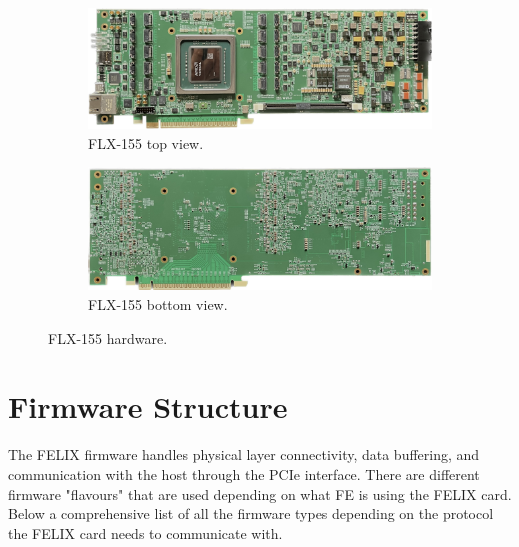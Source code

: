 \begin{figure}[H]
\centering
\begin{subfigure}[b]{0.7\textwidth}
    \centering
    \includegraphics[width=\textwidth]{images/felix/flx155_top.jpg}
    \caption{FLX-155 top view.}
    \label{fig:FLX-155-top}
\end{subfigure}

\vspace{0.2cm}

\begin{subfigure}[b]{0.7\textwidth}
    \centering
    \includegraphics[width=\textwidth]{images/felix/flx155_bot.jpg}
    \caption{FLX-155 bottom view.}
    \label{fig:FLX-155-bot}
\end{subfigure}
\caption{FLX-155 hardware.}
\label{fig:FLX-155}
\end{figure}

\clearpage
\section{Firmware Structure}
\label{sec:felix-firmware}

The \acs{FELIX} firmware handles physical layer connectivity, data buffering, and communication with the host through the \ac{PCIe} interface. There are different firmware "flavours" that are used depending on what \acl{FE} is using the \acs{FELIX} card.\\
Below a comprehensive list of all the firmware types depending on the protocol the \acs{FELIX} card needs to communicate with.

